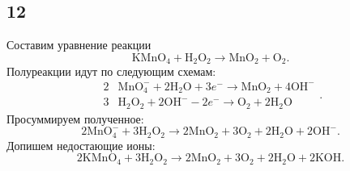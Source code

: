 \subsection{12}

Составим уравнение реакции
\[
\mathrm{KMnO_4}+\mathrm{H_2O_2}\longrightarrow\mathrm{MnO_2}+\mathrm{O_2}.
\]
Полуреакции идут по следующим схемам:
\[
\begin{array}{r|l}
	2 & \mathrm{MnO_4^-}+2\mathrm{H_2O}+3e^-\longrightarrow\mathrm{MnO_2}+4\mathrm{OH^-} \\
	3 & \mathrm{H_2O_2}+2\mathrm{OH^-}-2e^-\longrightarrow\mathrm{O_2}+2\mathrm{H_2O}
\end{array}.
\]
Просуммируем полученное:
\[
2\mathrm{MnO_4^-}+3\mathrm{H_2O_2}\longrightarrow2\mathrm{MnO_2}+3\mathrm{O_2}+2\mathrm{H_2O}+2\mathrm{OH^-}.
\]
Допишем недостающие ионы:
\[
2\mathrm{KMnO_4}+3\mathrm{H_2O_2}\longrightarrow2\mathrm{MnO_2}+3\mathrm{O_2}+2\mathrm{H_2O}+2\mathrm{KOH}.
\]